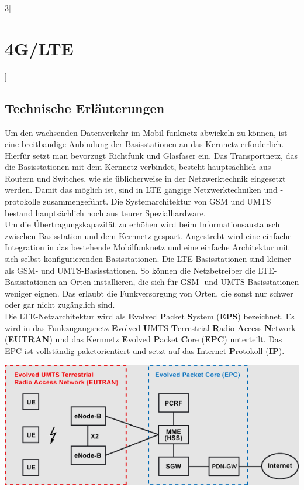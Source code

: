 \begin{multicols}{3}[\section{4G/LTE}]
\subsection*{Technische Erläuterungen}
Um den wachsenden Datenverkehr im Mobil-funknetz abwickeln zu können, ist eine breitbandige Anbindung der Basisstationen an das Kernnetz erforderlich. Hierfür setzt man bevorzugt Richtfunk und Glasfaser ein. Das Transportnetz, das die Basisstationen mit dem Kernnetz verbindet, besteht hauptsächlich aus Routern und Switches, wie sie üblicherweise in der Netzwerktechnik eingesetzt werden. Damit das möglich ist, sind in LTE gängige Netzwerktechniken und -protokolle zusammengeführt. Die Systemarchitektur von GSM und UMTS bestand hauptsächlich noch aus teurer Spezialhardware. \\
Um die Übertragungskapazität zu erhöhen wird beim Informationsaustausch zwischen Basisstation und dem Kernnetz gespart. Angestrebt wird eine einfache Integration in das bestehende Mobilfunknetz und eine einfache Architektur mit sich selbst konfigurierenden Basisstationen.
Die LTE-Basisstationen sind kleiner als GSM- und UMTS-Basisstationen. So können die Netzbetreiber die LTE-Basisstationen an Orten installieren, die sich für GSM- und UMTS-Basisstationen weniger eignen. Das erlaubt die Funkversorgung von Orten, die sonst nur schwer oder gar nicht zugänglich sind. \\
Die LTE-Netzarchitektur wird als \textbf{E}volved \textbf{P}acket \textbf{S}ystem (\textbf{EPS}) bezeichnet. Es wird in das Funkzugangsnetz \textbf{E}volved \textbf{U}MTS \textbf{T}errestrial \textbf{R}adio \textbf{A}ccess \textbf{N}etwork (\textbf{EUTRAN}) und das Kernnetz \textbf{E}volved \textbf{P}acket \textbf{C}ore (\textbf{EPC}) unterteilt. Das EPC ist vollständig paketorientiert und setzt auf das \textbf{I}nternet \textbf{P}rotokoll (\textbf{IP}).

\begin{Figure}
\includegraphics[width=\linewidth]{Kapitel/4GLTE/Grafiken/Modell.png}
\label{fig:vorlage.vorlesungssaal}
\end{Figure}


\end{multicols}
